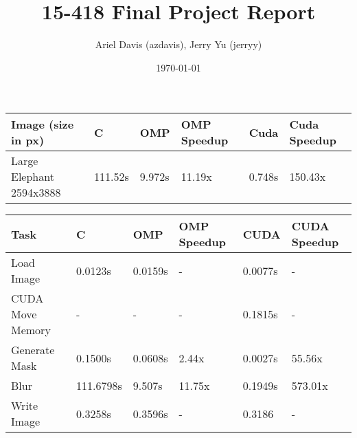 \documentclass[12pt]{article}
\author{Ariel Davis (azdavis), Jerry Yu (jerryy)}
\date{\today}
\title{15-418 Final Project Report}
\begin{document}
\maketitle

\begin{tabular}{l|l|l|l|l|l}
    Image (size in px) & C & OMP & OMP Speedup & Cuda & Cuda Speedup \\
    \hline
    Large Elephant 2594x3888 & 111.52s & 9.972s & 11.19x & 0.748s & 150.43x \\
\end{tabular}

\begin{tabular}{l|l|l|l|l|l}
    Task & C & OMP & OMP Speedup & CUDA & CUDA Speedup\\
    \hline
    Load Image & 0.0123s & 0.0159s & - & 0.0077s & -\\
    CUDA Move Memory & - & - & - & 0.1815s & -\\
    Generate Mask & 0.1500s & 0.0608s & 2.44x & 0.0027s & 55.56x\\
    Blur & 111.6798s & 9.507s & 11.75x & 0.1949s & 573.01x \\
    Write Image & 0.3258s & 0.3596s & - & 0.3186 & -
\end{tabular}
\end{document}
